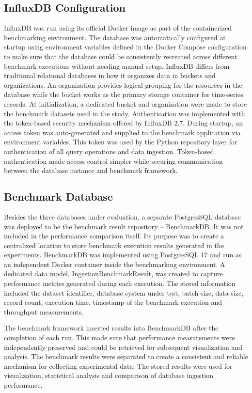 \subsection{InfluxDB Configuration}
InfluxDB was run using its official Docker image as part of the containerized benchmarking environment. The database was automatically configured at startup using environment variables defined in the Docker Compose configuration to make sure that the database could be consistently recreated across different benchmark executions without needing manual setup. InfluxDB differs from traditional relational databases in how it organizes data in buckets and organizations. An organization provides logical grouping for the resources in the database while the bucket works as the primary storage container for time-series records. At initialization, a dedicated bucket and organization were made to store the benchmark datasets used in the study. Authentication was implemented with the token-based security mechanism offered by InfluxDB 2.7. During startup, an access token was auto-generated and supplied to the benchmark application via environment variables. This token was used by the Python repository layer for authentication of all query operations and data ingestion. Token-based authentication made access control simpler while securing communication between the database instance and benchmark framework. 



\subsection{Benchmark Database}
Besides the three databases under evaluation, a separate PostgresSQL database was deployed to be the benchmark result repository – BenchmarkDB. It was not included in the performance comparison itself. Its purpose was to create a centralized location to store benchmark execution results generated in the experiments. BenchmarkDB was implemented using PostgresSQL 17 and run as an independent Docker container inside the benchmarking environment. A dedicated data model, IngestionBenchmarkResult, was created to capture performance metrics generated during each execution. The stored information included the dataset identifier, database system under test, batch size, data size, record count, execution time, timestamp of the benchmark execution and throughput measurements. 

The benchmark framework inserted results into BenchmarkDB after the completion of each run. This made sure that performance measurements were independently preserved and could be retrieved for subsequent visualization and analysis. The benchmark results were separated to create a consistent and reliable mechanism for collecting experimental data. The stored results were used for visualization, statistical analysis and comparison of database ingestion performance. 



